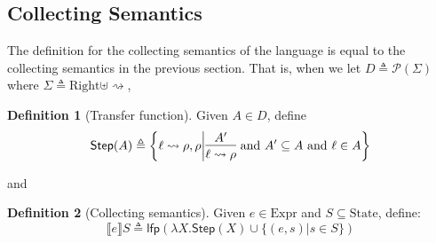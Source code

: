 \documentclass{article}
\theoremstyle{definition}
\newtheorem{definition}{Definition}[section]
\newcommand*{\pset}{\mathscr{P}}
\newcommand*{\Expr}{\text{Expr}}
\newcommand*{\Right}{\text{Right}}
\newcommand*{\State}{\text{State}}
\newcommand*{\lfp}{\mathsf{lfp}}
\newcommand*{\semarrow}{\rightsquigarrow}
\newcommand*{\sembracket}[1]{\lBrack{#1}\rBrack}
\begin{document}
\subsection{Collecting Semantics}
The definition for the collecting semantics of the language is equal to the collecting semantics in the previous section.
That is, when we let $D\triangleq\pset(\Sigma)$ where $\Sigma\triangleq\Right\uplus\semarrow$,
\begin{definition}[Transfer function]
  Given $A\in D$, define
  \[
    \mathsf{Step}(A)\triangleq
    \left\{\ell\semarrow\rho, \rho\middle|
    \begin{prooftree}[center=true]
      \hypo{A'}\infer1{\ell\semarrow\rho}
    \end{prooftree}\text{ and }
    A'\subseteq A\text{ and }\ell\in A
    \right\}
  \]
\end{definition}
and
\begin{definition}[Collecting semantics]
  Given $e\in\Expr$ and $S\subseteq\State$, define:
  \[
    \sembracket{e}S\triangleq\lfp(\lambda X.\mathsf{Step}(X)\cup\{(e,s)|s\in S\})
  \]
\end{definition}
\end{document}
